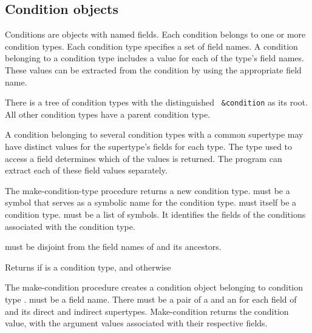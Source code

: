 \subsection{Condition objects}

Conditions are objects with named fields. Each condition belongs to
one or more condition types. Each condition type specifies a set of
field names. A condition belonging to a condition type includes a
value for each of the type's field names. These values can be
extracted from the condition by using the appropriate field name.

There is a tree of condition types with the distinguished {\tt
  \&condition} as its root. All other condition types have a parent
condition type.

A condition belonging to several condition types with a common
supertype may have distinct values for the supertype's fields for each
type. The type used to access a field determines which of the values
is returned. The program can extract each of these field values
separately.  

\begin{entry}{%
}

The {\cf make-condition-type} procedure returns a new condition type.  must
be a symbol that serves as a symbolic name for the condition type.
 must itself be a condition type.  must
be a list of symbols. It identifies the fields of the conditions
associated with the condition type.

 must be disjoint from the field names of
 and its ancestors. 
\end{entry}

\begin{entry}{%
}

Returns \schtrue{} if  is a condition type, and \schfalse{}
otherwise
\end{entry}

\begin{entry}{%
}

The {\cf make-condition} procedure creates a condition object belonging to condition
type .  must be a field name. There must be
a pair of a  and an  for each field of
 and its direct and indirect supertypes. {\cf
  Make-condition} returns the condition value, with the argument
values associated with their respective fields.
\end{entry}

